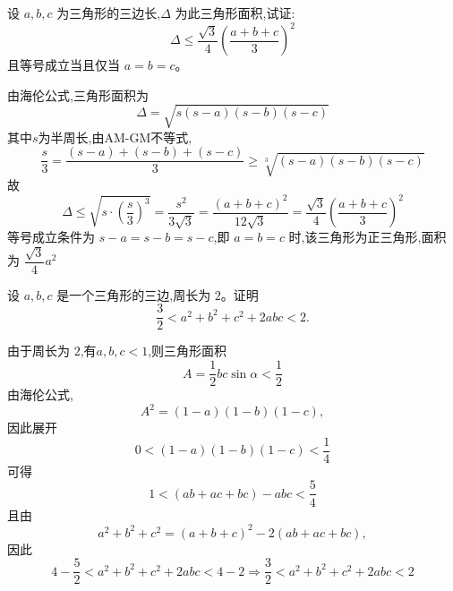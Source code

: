 \begin{questions}
    \question 设 $a, b, c$ 为三角形的三边长,$\Delta$ 为此三角形面积,试证:
    \[
    \Delta \le \frac{\sqrt{3}}{4} \left( \frac{a + b + c}{3} \right)^2
    \]
    且等号成立当且仅当 $a = b = c$。
    \begin{solution}
        由海伦公式,三角形面积为
        \[
        \Delta = \sqrt{s(s - a)(s - b)(s - c)}
        \]
        其中$s$为半周长,由AM-GM不等式,
        \[
        \frac{s}{3}=\frac{(s - a) + (s - b) + (s - c)}{3} \ge \sqrt[3]{(s - a)(s - b)(s - c)}
        \]
        故
        \[
        \Delta \le \sqrt{ s\cdot\left(  \frac{s}{3} \right)^3 } = \frac{s^2}{3\sqrt{3}} = \frac{(a + b + c)^2}{12\sqrt{3}} = \frac{\sqrt{3}}{4} \left( \frac{a + b + c}{3} \right)^2
        \]
        等号成立条件为 $s - a = s - b = s - c$,即 $a = b = c$ 时,该三角形为正三角形,面积为 $\dfrac{\sqrt{3}}{4} a^2$
    \end{solution}

    \question 设 $a, b, c$ 是一个三角形的三边,周长为 $2$。证明
    \[
    \frac{3}{2} < a^2+b^2+c^2 + 2abc < 2.
    \]
    \begin{solution}
        由于周长为 $2$,有$a,b,c <1$,则三角形面积
        \[
        A = \frac{1}{2} bc \sin \alpha < \frac{1}{2}
        \]
        由海伦公式,
        \[
        A^2 = (1-a)(1-b)(1-c),
        \]
        因此展开
        \[
        0 < (1-a)(1-b)(1-c) < \frac{1}{4}
        \]
        可得
        \[
        1 < (ab+ac+bc) - abc < \frac{5}{4}
        \]
        且由
        \[
        a^2+b^2+c^2 = (a+b+c)^2 - 2(ab+ac+bc),
        \]
        因此
        \[
        4 - \frac{5}{2} < a^2+b^2+c^2 + 2abc < 4 - 2 \Rightarrow \frac{3}{2} < a^2+b^2+c^2 + 2abc < 2
        \]
    \end{solution}
        

\end{questions}

